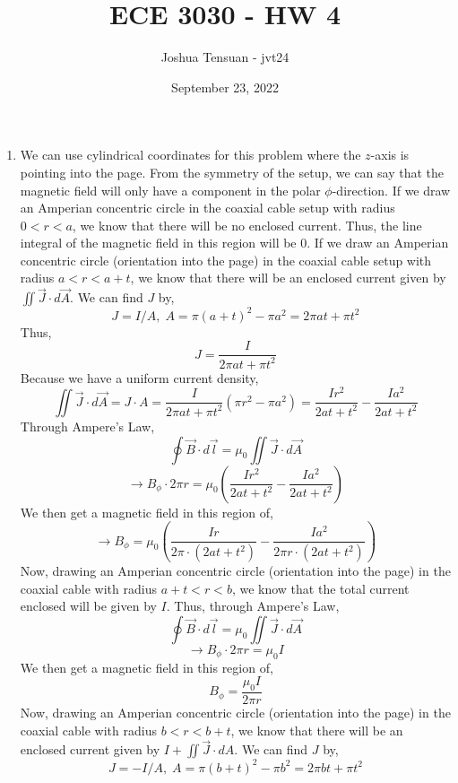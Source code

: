 \documentclass[12pt]{article}
\begin{document}
\usetikzlibrary{scopes}
\def\iangle{35} %

\def\down{-90}
\def\arcr{0.5cm} %


\title{ECE 3030 - HW 4}
\author{Joshua Tensuan - jvt24}
\date{September 23, 2022}
\maketitle


\begin{enumerate}
	\item [4.1]
	We can use cylindrical coordinates for this problem where the $z$-axis is pointing into the page.
	From the symmetry of the setup, we can say that the magnetic field will only have a component in the polar $\phi$-direction.
	If we draw an Amperian concentric circle in the coaxial cable setup with radius $0<r<a$, we know that there will be no enclosed current.
	Thus, the line integral of the magnetic field in this region will be $0$.
	If we draw an Amperian concentric circle (orientation into the page) in the coaxial cable setup with radius $a<r<a+t$, we know that there will be an enclosed current given by $\iint \vec J \cdot d\vec A$.
	We can find $J$ by,
	\[J=I/A, \; A= \pi(a+t)^2-\pi a^2=2\pi a t + \pi t^2\]
	Thus,
	\[J=\frac{I}{2\pi a t + \pi t^2}\]
	Because we have a uniform current density,
	\[\iint \vec J \cdot d\vec A = J\cdot A = \frac{I}{2\pi a t + \pi t ^ 2}\left(\pi r^2-\pi a^2\right)=\frac{Ir^2}{2at + t^2}-\frac{Ia^2}{2at + t^2}\]
	Through Ampere's Law,
	\[\oint \vec B \cdot d\vec l =\mu_0 \iint \vec J \cdot d\vec A\]
	\[\to B_\phi\cdot 2\pi r = \mu_0\left(\frac{Ir^2}{2at + t^2}-\frac{Ia^2}{2at + t^2}\right)\]
	We then get a magnetic field in this region of,
	\[\to B_\phi = \mu_0\left(\frac{Ir}{2\pi\cdot(2at + t^2)}-\frac{Ia^2}{2\pi r\cdot (2at + t^2)}\right)\]
	Now, drawing an Amperian concentric circle (orientation into the page) in the coaxial cable with radius $a+t<r<b$, we know that the total current enclosed will be given by $I$.
	Thus, through Ampere's Law,
	\[\oint \vec B \cdot d\vec l = \mu_0\iint \vec J \cdot d\vec A\]
	\[\to B_\phi \cdot 2\pi r = \mu_0I\]
	We then get a magnetic field in this region of,
	\[B_\phi = \frac{\mu_0 I}{2\pi r}\]
	Now, drawing an Amperian concentric circle (orientation into the page) in the coaxial cable with radius $b < r < b+t$, we know that there will be an enclosed current given by $I+\iint \vec J \cdot dA$.
	We can find $J$ by,
	\[J=-I/A, \; A = \pi(b+t)^2-\pi b^2=2\pi b t + \pi t^2\]

\end{enumerate}
\end{document}

